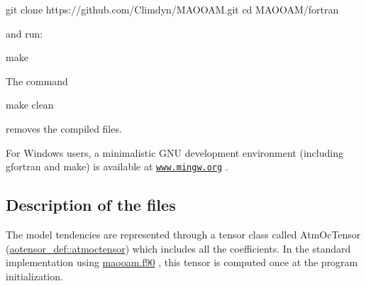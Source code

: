 \begin{DoxyCode}
git clone https://github.com/Climdyn/MAOOAM.git
cd MAOOAM/fortran
\end{DoxyCode}


and run\+:


\begin{DoxyCode}
make
\end{DoxyCode}


The command


\begin{DoxyCode}
make clean
\end{DoxyCode}
 removes the compiled files.

For Windows users, a minimalistic G\+NU development environment (including gfortran and make) is available at \href{http://www.mingw.org}{\tt www.\+mingw.\+org} .





\subsection*{Description of the files}

The model tendencies are represented through a tensor class called Atm\+Oc\+Tensor (\hyperlink{structaotensor__def_1_1atmoctensor}{aotensor\+\_\+def\+::atmoctensor}) which includes all the coefficients. In the standard implementation using \hyperlink{maooam_8f90_source}{maooam.\+f90} , this tensor is computed once at the program initialization.


